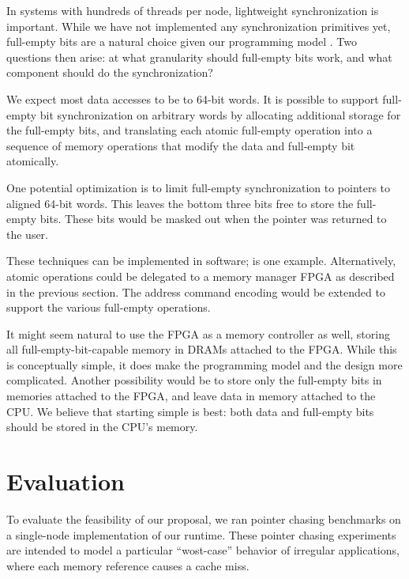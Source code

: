 \documentclass{acm_proc_article-sp}
\begin{document}
In systems with hundreds of threads per node, lightweight
synchronization is important. While we have not implemented any
synchronization primitives yet, full-empty bits are a natural choice
given our programming model . Two questions then arise: at what
granularity should full-empty bits work, and what component should do
the synchronization?

We expect most data accesses to be to 64-bit words. It is possible to
support full-empty bit synchronization on arbitrary words by
allocating additional storage for the full-empty bits, and translating
each atomic full-empty operation into a sequence of memory operations
that modify the data and full-empty bit atomically. 

One potential optimization is to limit full-empty synchronization to
pointers to aligned 64-bit words. This leaves the bottom three bits
free to store the full-empty bits. These bits would be masked out when
the pointer was returned to the user.

These techniques can be implemented in software; \cite{qthreads} is
one example. Alternatively, atomic operations could be delegated to a
memory manager FPGA as described in the previous section. The address
command encoding would be extended to support the various full-empty
operations.

It might seem natural to use the FPGA as a memory controller as
well, storing all full-empty-bit-capable memory in DRAMs attached to
the FPGA. While this is conceptually simple, it does make the
programming model and the design more complicated. Another possibility
would be to store only the full-empty bits in memories attached to the
FPGA, and leave data in memory attached to the CPU. We believe that
starting simple is best: both data and full-empty bits should be
stored in the CPU's memory. 


\section{Evaluation}
\label{sec:evaluation}

To evaluate the feasibility of our proposal, we ran pointer chasing
benchmarks on a single-node implementation of our runtime. These
pointer chasing experiments are intended to model a particular
``wost-case'' behavior of irregular applications, where each memory
reference causes a cache miss.
\end{document}
